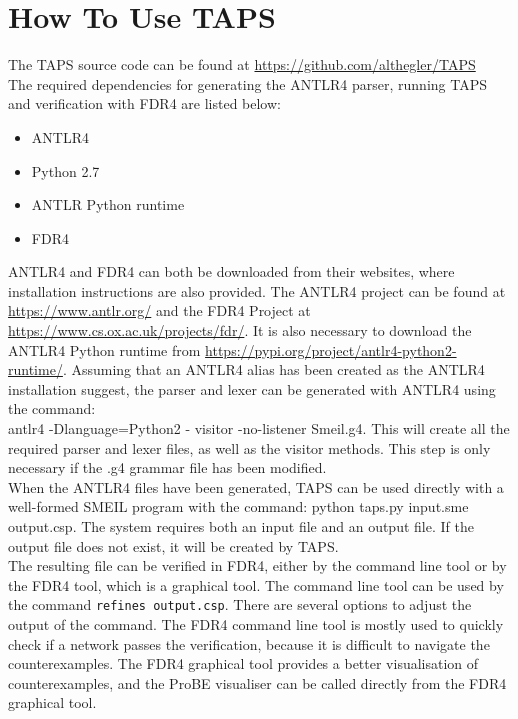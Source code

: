 \chapter{How To Use TAPS}
The TAPS source code can be found at \url{https://github.com/althegler/TAPS}\\

The required dependencies for generating the ANTLR4 parser, running TAPS and verification with FDR4 are listed below:
\begin{itemize}
    \item ANTLR4
    \item Python 2.7
    \item ANTLR Python runtime
    \item FDR4
\end{itemize}

ANTLR4 and FDR4 can both be downloaded from their websites, where installation instructions are also provided.
The ANTLR4 project can be found at \url{https://www.antlr.org/} and the FDR4 Project at \url{https://www.cs.ox.ac.uk/projects/fdr/}.
It is also necessary to download the ANTLR4 Python runtime from \url{https://pypi.org/project/antlr4-python2-runtime/}.
Assuming that an ANTLR4 alias has been created as the ANTLR4 installation suggest, the parser and lexer can be generated with ANTLR4 using the command:\\ {\ttfamily antlr4 -Dlanguage=Python2 - visitor -no-listener Smeil.g4.}
This will create all the required parser and lexer files, as well as the visitor methods. This step is only necessary if the .g4 grammar file has been modified.\\

When the ANTLR4 files have been generated, TAPS can be used directly with a well-formed SMEIL program with the command: {\ttfamily python taps.py input.sme output.csp}. The system requires both an input file and an output file. If the output file does not exist, it will be created by TAPS. \\

The resulting \cspm{} file can be verified in FDR4, either by the command line tool or by the FDR4 tool, which is a graphical tool. The command line tool can be used by the command \texttt{refines output.csp}. There are several options to adjust the output of the command. The FDR4 command line tool is mostly used to quickly check if a network passes the verification, because it is difficult to navigate the counterexamples. The FDR4 graphical tool provides a better visualisation of counterexamples, and the ProBE visualiser can be called directly from the FDR4 graphical tool.


